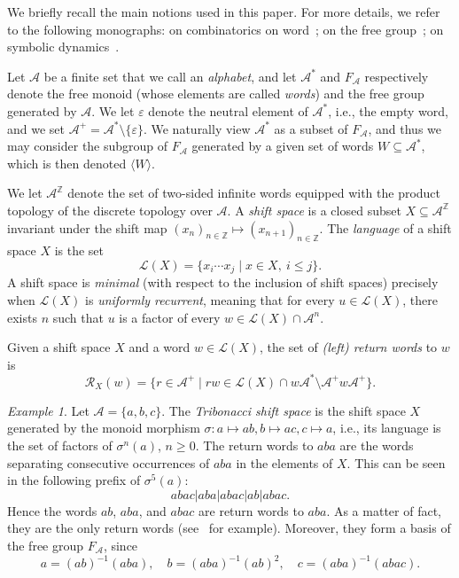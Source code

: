 \documentclass{amsart}
\newcommand*{\Z}{\mathbb{Z}}
\newcommand*{\ret}{\mathcal{R}}
\newcommand*{\lang}{\mathcal{L}}
\newcommand*{\cA}{\mathcal{A}}
\newcommand*{\from}{\colon}
\newcommand*{\emptyw}{\varepsilon}
\newcommand*{\gen}[1]{\langle #1\rangle}
\theoremstyle{plain}
\theoremstyle{definition}
\theoremstyle{remark}
\newtheorem{example}[theorem]{Example}
\begin{document}
We briefly recall the main notions used in this paper. For more details, we refer to the following monographs: on combinatorics on word~\cite{book/Lothaire1997}; on the free group~\cite{book/Lyndon2001}; on symbolic dynamics~\cite{book/Lind1995}.

Let $\cA$ be a finite set that we call an {\em alphabet}, and let $\cA^*$ and $F_\cA$ respectively denote the free monoid (whose elements are called \emph{words}) and the free group generated by $\cA$. We let $\emptyw$ denote the neutral element of $\cA^*$, i.e., the empty word, and we set $\cA^+ = \cA^* \setminus \{\emptyw\}$. We naturally view $\cA^*$ as a subset of $F_\cA$, and thus we may consider the subgroup of $F_\cA$ generated by a given set of words $W \subseteq \cA^*$, which is then denoted $\gen{W}$.

We let $\cA^\Z$ denote the set of two-sided infinite words equipped with the product topology of the discrete topology over $\cA$. A \emph{shift space} is a closed subset $X\subseteq\cA^\Z$ invariant under the shift map $(x_n)_{n\in\Z}\mapsto (x_{n+1})_{n\in\Z}$. The \emph{language} of a shift space $X$ is the set
\begin{equation*}
    \lang(X) = \{ x_i\cdots x_{j} \mid x\in X, \ i\leq j\}.
\end{equation*}
A shift space is \emph{minimal} (with respect to the inclusion of shift spaces) precisely when $\lang(X)$ is \emph{uniformly recurrent}, meaning that for every $u\in \lang(X)$, there exists $n$ such that $u$ is a factor of every $w\in \lang(X) \cap \cA^n$.

Given a shift space $X$ and a word $w \in \lang(X)$, the set of \emph{(left) return words} to $w$ is
\[
    \ret_X(w) = \{r \in \cA^+ \mid rw\in \lang(X)\cap w\cA^*\setminus \cA^+w\cA^+\}.
\]

\begin{example}
    Let $\cA = \{a,b,c\}$. The \emph{Tribonacci shift space} is the shift space $X$ generated by the monoid morphism $\sigma\from a \mapsto ab, b \mapsto ac, c \mapsto a$, i.e., its language is the set of factors of $\sigma^n(a)$, $n \geq 0$.
    The return words to $aba$ are the words separating consecutive occurrences of $aba$ in the elements of $X$. This can be seen in the following prefix of $\sigma^5(a)$:
    \[
        abac|aba|abac|ab|abac.
    \]
    Hence the words $ab$, $aba$, and $abac$ are return words to $aba$. As a matter of fact, they are the only return words (see~\cite[Corollary 4.5]{Justin2000} for example). Moreover, they form a basis of the free group $F_{\cA}$, since
    \begin{equation*}
        a = (ab)^{-1}(aba), \quad b = (aba)^{-1}(ab)^2, \quad c = (aba)^{-1}(abac).
    \end{equation*}
\end{example}
\end{document}

